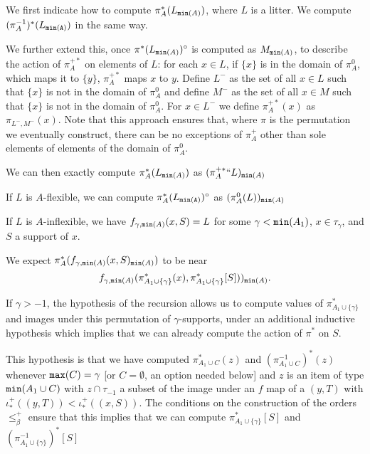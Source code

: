 \documentclass[112pt]{article}
\begin{document}
\begin{description}
We first indicate how to compute $\pi^*_A(L_{{\tt min}(A)})$, where $L$ is a litter.  We compute  $(\pi^{-1}_A)^*(L_{\tt min(A)})$ in the same way.

We further extend this, once $\pi^*(L_{{\tt min}(A)})^\circ$ is computed as $M_{{\tt min}(A)}$, to describe the action of $\pi^{+*}_A$ on elements of $L$:
for each $x \in L$, if $\{x\}$ is in the domain of $\pi^0_A$, which maps it to $\{y\}$, $\pi^{+*}_{A}$ maps $x$ to $y$.  Define $L^-$ as the set of all $x \in L$ such that
$\{x\}$ is not in the domain of $\pi^0_A$ and define $M^-$ as the set of all $x \in M$ such that
$\{x\}$ is not in the domain of $\pi^0_A$.  For $x \in L^-$ we define $\pi^{+*}_{A}(x)$ as $\pi_{L^-,M^-}(x)$.  Note that this approach ensures that, where $\pi$ is the permutation we eventually construct, there can be no exceptions of $\pi^+_A$ other than sole elements of elements of the domain of $\pi^0_A$.

We can then exactly compute $\pi^*_A(L_{{\tt min}(A)})$ as $(\pi^{+*}_A``L)_{{\tt min}(A)}$

If $L$ is $A$-flexible, we can compute $\pi^*_A(L_{\tt {\tt min}(A)})^\circ$ as $(\pi^0_A(L))_{{\tt min}(A)}$

If $L$ is $A$-inflexible, we have $f_{\gamma,{\tt min}(A)}(x,S) = L$ for some $\gamma<{\tt min}(A_1)$, $x \in \tau_\gamma$, and $S$ a support of $x$.

We expect $\pi^*_A(f_{\gamma,{\tt min}(A)}(x,S)_{{\tt min}(A)})$ to be near $$f_{ \gamma,{\tt min}(A)}(\pi^*_{A_1\cup \{\gamma\}}(x),\pi^*_{A_1\cup \{\gamma\}}[S]))_{{\tt min}(A)}.$$


If $\gamma>-1$, the hypothesis of the recursion allows us to compute values of $\pi^*_{A_1\cup \{\gamma\}}$ and images under this permutation of $\gamma$-supports,
under an additional inductive hypothesis which implies that we can already compute the action of $\pi^*$ on $S$.

This hypothesis is that  we have computed $\pi_{A_1 \cup C}^*(z)$ and $(\pi_{A_1 \cup C}^{-1})^*(z)$ whenever ${\tt max}(C)=\gamma$ [or $C = \emptyset$, an option needed below] and $z$ is an item of type ${\tt min}(A_1 \cup C)$ with $z \cap \tau_{-1}$ a subset
of the image under an $f$ map of a $(y,T)$ with $\iota^+_*((y,T)) < \iota^+_*((x,S))$.  The conditions on the construction of the orders
$\leq^+_\beta$ ensure that this implies that we can compute $\pi_{A_1 \cup \{\gamma\}}^*[S]$ and $(\pi_{A_1 \cup \{\gamma\}}^{-1})^*[S]$ 


\end{description}
\end{document}
